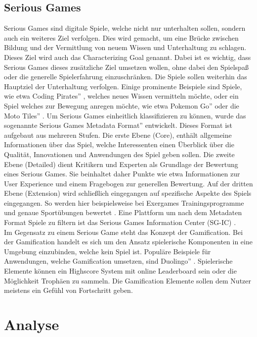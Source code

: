 \section{Serious Games}
Serious Games sind digitale Spiele, welche nicht nur unterhalten sollen, sondern auch ein weiteres Ziel verfolgen. Dies wird gemacht, um eine Brücke zwischen Bildung und der Vermittlung von neuem Wissen und Unterhaltung zu schlagen. Dieses Ziel wird auch das Characterizing Goal genannt. Dabei ist es wichtig, dass Serious Games dieses zusätzliche Ziel umsetzen wollen, ohne dabei den Spielspaß oder die generelle Spielerfahrung einzuschränken. Die Spiele sollen weiterhin das Hauptziel der Unterhaltung verfolgen. Einige prominente Beispiele sind Spiele, wie etwa \glqq Coding Pirates'' \cite{coding_game}, welches neues Wissen vermitteln möchte, oder ein Spiel welches zur Bewegung anregen möchte, wie etwa \glqq Pokemon Go''\cite{althoff2016influence} oder die \glqq Moto Tiles'' \cite{liu2018playful}. Um Serious Games einheitlich klassifizieren zu können, wurde das sogenannte \glqq Serious Games Metadata Format'' entwickelt. Dieses Format ist aufgebaut aus mehreren Stufen. Die erste Ebene (Core), enthält allgemeine Informationen über das Spiel, welche Interessenten einen Überblick über die Qualität, Innovationen und Anwendungen des Spiel geben sollen. Die zweite Ebene (Detailed) dient Kritikern und Experten als Grundlage der Bewertung eines Serious Games. Sie beinhaltet daher Punkte wie etwa Informationen zur User Experience und einem Fragebogen zur generellen Bewertung. Auf der dritten Ebene (Extension) wird schließlich eingegangen auf spezifische Aspekte des Spiels eingegangen. So werden hier beispielsweise bei Exergames Trainingsprogramme und genaue Sportübungen bewertet \cite{gobel2011makes}. Eine Plattform um nach dem Metadaten Format Spiele zu filtern ist das Serious Games Information Center (SG-IC) \cite{sg_ic}. \\
Im Gegensatz zu einem Serious Game steht das Konzept der Gamification. Bei der Gamification handelt es sich um den Ansatz spielerische Komponenten in eine Umgebung einzubinden, welche kein Spiel ist. Populäre Beispiele für Anwendungen, welche Gamification umsetzen, sind \glqq Duolingo'' \cite{duolingo}. Spielerische Elemente können ein Highscore System mit online Leaderboard sein oder die Möglichkeit Trophäen zu sammeln. Die Gamification Elemente sollen dem Nutzer meistens ein Gefühl von Fortschritt geben. 

\chapter{Analyse}

